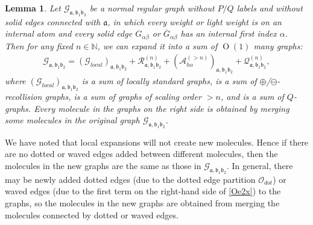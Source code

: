 \documentclass{article}
\newcommand{\1}{\mathds{1}}
\numberwithin{equation}{section}
\newcommand{\al}{\alpha}
\newcommand{\fa}{{\mathfrak a}}
\newcommand{\fb}{{\mathfrak b}}
\renewcommand{\cal}{\mathcal}
\newcommand{\N}{\mathbb{N}}
\DeclareMathOperator{\OO}{O}
\theoremstyle{plain} %
\newtheorem{lemma}[theorem]{Lemma}
\theoremstyle{remark}
\newtheorem{remark}[theorem]{Remark}
\newcommand{\PGn}{\mathcal R^{(n)}}
\newcommand{\AGn}{\mathcal A^{(>n)}_{ho}}
\newcommand{\QGn}{\mathcal Q^{(n)}}
\begin{document}
\begin{lemma} \label{lvl1 lemma}
Let $\cal G_{\fa, \fb_1\fb_2}$ be a normal regular graph without $P/Q$ labels and without solid edges connected with $\fa$, in which every weight or light weight is on an internal atom and every solid edge $G_{\al\beta}$ or $\overline G_{\al\beta}$ has an internal first index $\al$. Then for any fixed $n\in \N$, we can expand it into a sum of $\OO(1)$ many graphs:
\begin{align}\label{expand lvl1}
\cal G_{\fa, \fb_1\fb_2} =  (\cal G_{local})_{\fa, \fb_1\fb_2}  + \PGn_{\fa,\fb_1\fb_2} +  (\AGn)_{\fa,\fb_1\fb_2} + \QGn_{\fa,\fb_1\fb_2} ,
\end{align}
where $(\cal G_{local})_{\fa, \fb_1\fb_2} $ is a sum of locally standard graphs, \smash{$ \PGn_{\fa,\fb_1\fb_2} $} is a sum of  $\oplus$/$\ominus$-recollision graphs, \smash{$(\AGn)_{\fa,\fb_1\fb_2}$} is a sum of graphs of scaling order $> n$, and \smash{$(\QGn)_{\fa,\fb_1\fb_2} $} is a sum of $Q$-graphs.  Every molecule in the graphs on the right side is obtained by merging some molecules in the original graph $\cal G_{\fa, \fb_1\fb_2}$. 
\end{lemma}


We have  noted that local expansions will not create new molecules. Hence if there are no dotted or waved edges added between different molecules, then the molecules in the new graphs are the same as those in $\cal G_{\fa, \fb_1\fb_2}$. In general, there may be newly added dotted edges (due to the dotted edge partition $\cal O_{dot}$) or waved edges (due to the first term on the right-hand side of \eqref{Oe2x}) to the graphs, %
so the molecules in the new graphs are obtained from merging the molecules connected by dotted or waved edges. %
 
\end{document}
